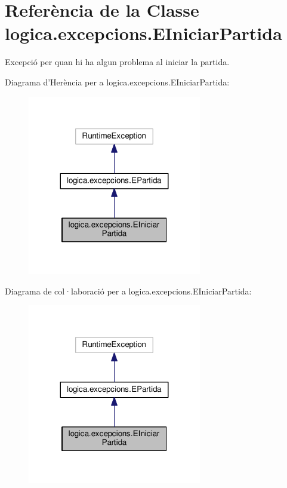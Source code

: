 \hypertarget{classlogica_1_1excepcions_1_1_e_iniciar_partida}{\section{Referència de la Classe logica.\+excepcions.\+E\+Iniciar\+Partida}
\label{classlogica_1_1excepcions_1_1_e_iniciar_partida}
}


Excepció per quan hi ha algun problema al iniciar la partida.  




Diagrama d'Herència per a logica.\+excepcions.\+E\+Iniciar\+Partida\+:\nopagebreak
\begin{figure}[H]
\begin{center}
\leavevmode
\includegraphics[width=215pt]{classlogica_1_1excepcions_1_1_e_iniciar_partida__inherit__graph}
\end{center}
\end{figure}


Diagrama de col·laboració per a logica.\+excepcions.\+E\+Iniciar\+Partida\+:\nopagebreak
\begin{figure}[H]
\begin{center}
\leavevmode
\includegraphics[width=215pt]{classlogica_1_1excepcions_1_1_e_iniciar_partida__coll__graph}
\end{center}
\end{figure}
